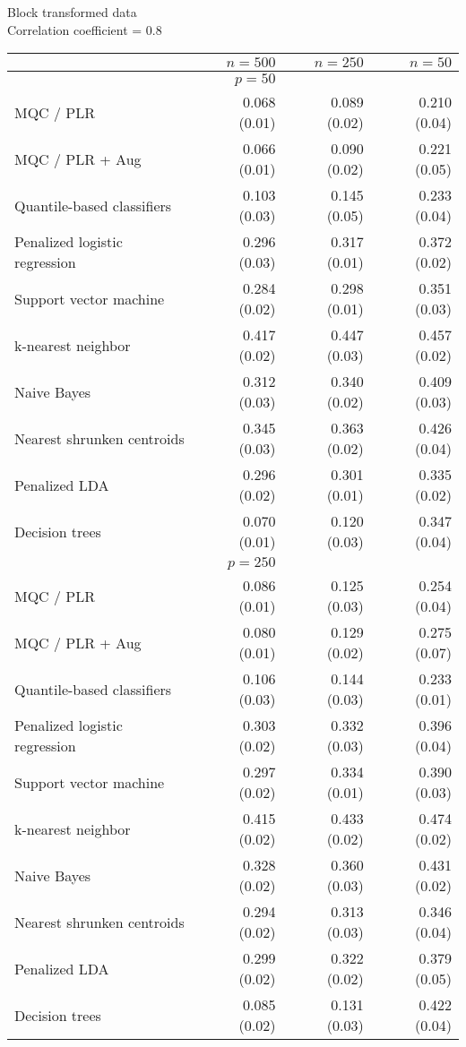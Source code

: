 \begin{table}[p]
  \centering
  Block transformed data \\
  Correlation coefficient = 0.8 \\[2ex]
  \begin{adjustbox}{max size={\textwidth}{10cm}}
    \begin{tabular}{l@{\extracolsep{15mm}}rrr}
      
      \hline
      & $n=500$ & $n=250$ & $n=50$ \\ 
      \hline
      & $p = 50$ \\
      \hline

      MQC / PLR & 0.068 (0.01) & 0.089 (0.02) & 0.210 (0.04) \\ 
      MQC / PLR + Aug & 0.066 (0.01) & 0.090 (0.02) & 0.221 (0.05) \\ 
      Quantile-based classifiers & 0.103 (0.03) & 0.145 (0.05) & 0.233 (0.04) \\ 
      Penalized logistic regression & 0.296 (0.03) & 0.317 (0.01) & 0.372 (0.02) \\ 
      Support vector machine & 0.284 (0.02) & 0.298 (0.01) & 0.351 (0.03) \\ 
      k-nearest neighbor & 0.417 (0.02) & 0.447 (0.03) & 0.457 (0.02) \\ 
      Naive Bayes & 0.312 (0.03) & 0.340 (0.02) & 0.409 (0.03) \\ 
      Nearest shrunken centroids & 0.345 (0.03) & 0.363 (0.02) & 0.426 (0.04) \\ 
      Penalized LDA & 0.296 (0.02) & 0.301 (0.01) & 0.335 (0.02) \\ 
      Decision trees & 0.070 (0.01) & 0.120 (0.03) & 0.347 (0.04) \\ [2ex]

      \hline
      & $p = 250$ \\
      \hline

      MQC / PLR & 0.086 (0.01) & 0.125 (0.03) & 0.254 (0.04) \\ 
      MQC / PLR + Aug & 0.080 (0.01) & 0.129 (0.02) & 0.275 (0.07) \\ 
      Quantile-based classifiers & 0.106 (0.03) & 0.144 (0.03) & 0.233 (0.01) \\ 
      Penalized logistic regression & 0.303 (0.02) & 0.332 (0.03) & 0.396 (0.04) \\ 
      Support vector machine & 0.297 (0.02) & 0.334 (0.01) & 0.390 (0.03) \\ 
      k-nearest neighbor & 0.415 (0.02) & 0.433 (0.02) & 0.474 (0.02) \\ 
      Naive Bayes & 0.328 (0.02) & 0.360 (0.03) & 0.431 (0.02) \\ 
      Nearest shrunken centroids & 0.294 (0.02) & 0.313 (0.03) & 0.346 (0.04) \\ 
      Penalized LDA & 0.299 (0.02) & 0.322 (0.02) & 0.379 (0.05) \\ 
      Decision trees & 0.085 (0.02) & 0.131 (0.03) & 0.422 (0.04) \\ [2ex]


\end{tabular}
\end{adjustbox}
\end{table}

